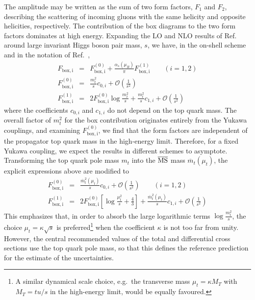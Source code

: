 The amplitude may be written as the sum of
two form factors, $F_1$ and $F_2$, describing the scattering of incoming gluons with the
same helicity and opposite helicities, respectively. The contribution of the box
diagrams to the two form factors dominates at high energy.
Expanding the LO and NLO results of Ref.~\cite{Davies:2018qvx} around
large invariant Higgs boson pair mass, $s$, we have, in the on-shell scheme and
in the notation of Ref.~\cite{Davies:2018qvx},
\begin{eqnarray}
F_\mathrm{box,i} & = & F_\mathrm{box,i}^{(0)} +
\frac{\alpha_s(\mu_R)}{\pi} F_\mathrm{box,i}^{(1)} \qquad (i=1,2) \nonumber \\
F_\mathrm{box,i}^{(0)} & = & \frac{m_t^2}{s} c_{0,i} +
\mathcal{O}\left(\frac{1}{s^2}\right)  \nonumber \\
F_\mathrm{box,i}^{(1)} & = & 2 F_\mathrm{box,i}^{(0)} \log\frac{m_t^2}{s}
+ \frac{m_t^2}{s}  c_{1,i} +
\mathcal{O}\left(\frac{1}{s^2}\right)
\label{eq:hhexp}
\end{eqnarray}
where the coefficients $c_{0,i}$ and $c_{1,i}$ do not depend on the
top quark mass. The overall factor of $m_t^2$ for the box contribution
originates entirely from the Yukawa couplings, and examining $F_\mathrm{box,i}^{(0)}$,
we find that the form factors are independent of the propagator top quark mass in the high-energy limit.
Therefore, for a fixed Yukawa coupling, we expect the results in different schemes to asymptote.
Transforming the top quark pole mass $m_t$ into the $\overline{\rm MS}$ mass
$\overline{m}_t(\mu_t)$, the explicit expressions above are modified to
\cite{Baglio:2020ini}
\begin{eqnarray}
F_\mathrm{box,i}^{(0)} & = & \frac{\overline{m}_t^2(\mu_t)}{s} c_{0,i}
+ \mathcal{O}\left(\frac{1}{s^2}\right) \qquad (i=1,2) \nonumber \\
F_\mathrm{box,i}^{(1)} & = & 2 F_\mathrm{box,i}^{(0)}
\left[\log\frac{\mu_t^2}{s} + \frac{4}{3}\right] +
\frac{\overline{m}_t^2(\mu_t)}{s} c_{1,i} +
\mathcal{O}\left(\frac{1}{s^2}\right)
\label{eq:NLO-MSbar}
\end{eqnarray}
This emphasizes that, in order to absorb the large logarithmic terms $\log\frac{m_t^2}{s}$,
the choice $\mu_t=\kappa\sqrt{s}$ is preferred\footnote{A similar dynamical scale choice, e.g.~the transverse mass $\mu_t = \kappa M_T$ with $M_T = tu/s$ in the high-energy limit, would be equally favoured.} when the coefficient $\kappa$ is not too far from unity. However, the central recommended values of the total and differential cross sections use the top quark pole mass, so that this defines the reference prediction for the estimate of the uncertainties.


